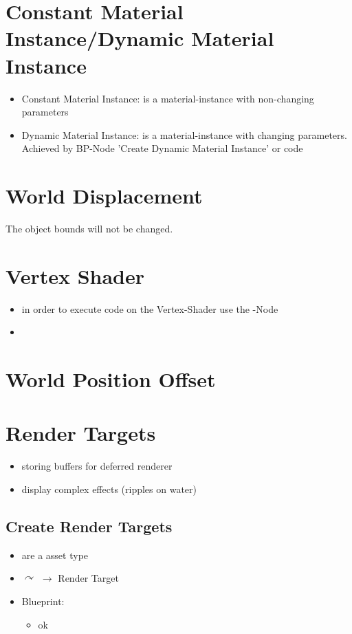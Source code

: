     \section{Constant Material Instance/Dynamic Material Instance}
        \begin{itemize}
            \item Constant Material Instance: is a material-instance with non-changing parameters
            \item Dynamic Material Instance: is a material-instance with changing parameters. Achieved by BP-Node 'Create Dynamic Material Instance' or code
        \end{itemize}

    \section{World Displacement}
        The object bounds will not be changed. \\


    \section{Vertex Shader}
        \begin{itemize}
            \item in order to execute code on the Vertex-Shader use the -Node 
            \item 
        \end{itemize}

    \section{World Position Offset}


    \section{Render Targets}
        \begin{itemize}
            \item storing buffers for deferred renderer
            \item display complex effects (ripples on water)
        \end{itemize}
        \subsection{Create Render Targets}
            \begin{itemize}
                \item are a asset type
                \item $\curvearrowright$  $\rightarrow$ Render Target
                \item Blueprint:
                \begin{itemize}
                    \item ok
                \end{itemize}
            \end{itemize}

